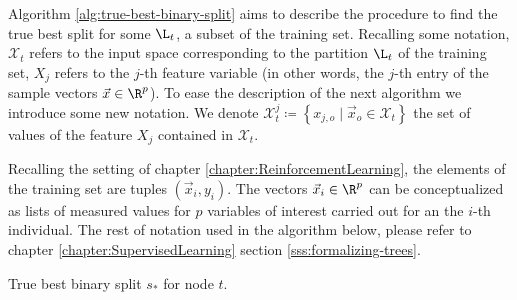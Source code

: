 Algorithm \ref{alg:true-best-binary-split} aims to describe the procedure to
find the true best split for some $\L_t$, a subset of the training set.
Recalling some notation, $\mathcal{X}_t$ refers to the input space corresponding
to the partition $\L_t$ of the training set, $X_j$ refers to the $j$-th feature
variable (in other words, the $j$-th entry of the sample vectors $\vec{x} \in
\R^{p}$). To ease the description of the next algorithm we introduce some new
notation. We denote $\mathcal{X}_{t}^{j} \coloneqq \left\{ x_{j, o} \mid
\vec{x}_{o} \in \mathcal{X}_t \right\}$ the set of values of the feature $X_j$
contained in $\mathcal{X}_t$. 

Recalling the setting of chapter \ref{chapter:ReinforcementLearning}, the
elements of the training set are tuples $(\vec{x}_i, y_i)$. The vectors
$\vec{x}_i \in \R^{p}$ can be conceptualized as lists of measured values for $p$
variables of interest carried out for an the $i$-th individual.  The rest of
notation used in the algorithm below, please refer to chapter
\ref{chapter:SupervisedLearning} section \ref{sss:formalizing-trees}.

\begin{algorithm}
    \caption[True best binary split for node $t$.]{True best binary split $s_*$ for node $t$.}
    \label{alg:true-best-binary-split}
\end{algorithm}


